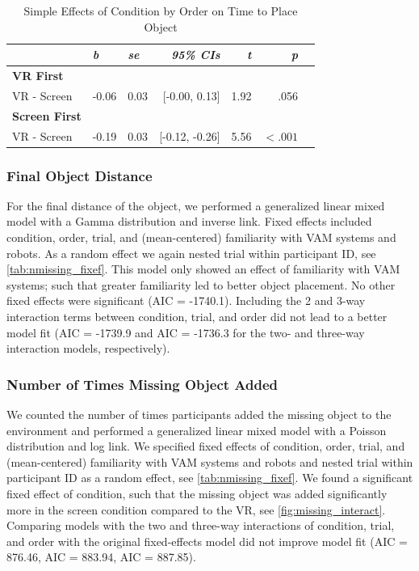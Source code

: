 \documentclass[letterpaper, 10 pt, conference]{ieeeconf}  %
\begin{document}
    \begin{table}[b]
        \caption{Simple Effects of Condition by Order on Time to Place Object}
        \centering
        \footnotesize
        \label{tab:posthoc_place_conditionxorder}
        \begin{tabular}{lllrrrr}
            \toprule
             &  \textit{b} & \textit{se} & \textit{95\% CIs} &\textit{t} & \textit{p} \\ 
             \midrule
         \textbf{VR First} & & & & & \\
                VR - Screen & -0.06 & 0.03 & [-0.00, 0.13] & 1.92 & .056 \\  \midrule
         \textbf{Screen First} & & & & & \\
                VR - Screen & -0.19 & 0.03 & [-0.12, -0.26] & 5.56 & $<.001$ \\  
            \bottomrule
        \end{tabular}
        \end{table}

\subsubsection{Final Object Distance}
For the final distance of the object, we performed a generalized linear mixed model with a Gamma distribution and inverse link. Fixed effects included condition, order, trial, and (mean-centered) familiarity with VAM systems and robots. As a random effect we again nested trial within participant ID, see \cref{tab:nmissing_fixef}. This model only showed an effect of familiarity with VAM systems; such that greater familiarity led to better object placement. No other fixed effects were significant (AIC = -1740.1). Including the 2 and 3-way interaction terms between condition, trial, and order did not lead to a better model fit (AIC = -1739.9 and AIC = -1736.3 for the two- and three-way interaction models, respectively). 

\subsubsection{Number of Times Missing Object Added}
We counted the number of times participants added the missing object to the environment and performed a generalized linear mixed model with a Poisson distribution and log link. We specified fixed effects of condition, order, trial, and (mean-centered) familiarity with VAM systems and robots and nested trial within participant ID as a random effect, see \cref{tab:nmissing_fixef}. We found a significant fixed effect of condition, such that the missing object was added significantly more in the screen condition compared to the VR, see \cref{fig:missing_interact}. Comparing models with the two and three-way interactions of condition, trial, and order with the original fixed-effects model did not improve model fit (AIC = 876.46, AIC = 883.94, AIC = 887.85). 
\end{document}
